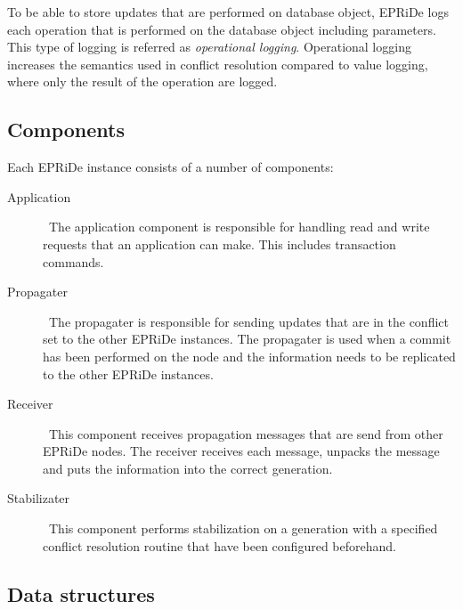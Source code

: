 To be able to store updates that are performed on database object, EPRiDe logs each operation that is performed on the database object including parameters. This type of logging is referred as \emph{operational logging}. Operational logging increases the semantics used in conflict resolution compared to value logging, where only the result of the operation are logged. 




\subsection{Components} %
\label{sub:components}

Each EPRiDe instance consists of a number of components:

\begin{description}
	\item[Application] \
		The application component is responsible for handling read and write requests that an application can make. This includes transaction commands.
		
	\item[Propagater] \
		The propagater is responsible for sending updates that are in the conflict set to the other EPRiDe instances. The propagater is used  when a commit has been performed on the node and the information needs to be replicated to the other EPRiDe instances.
		
	\item[Receiver] \
		This component receives propagation messages that are send from other EPRiDe nodes. The receiver receives each message, unpacks the message and puts the information into the correct generation.
		
	\item[Stabilizater] \
		This component performs stabilization on a generation with a specified conflict resolution routine that have been configured beforehand.
\end{description}


\subsection{Data structures} %
\label{sub:datastructures}

